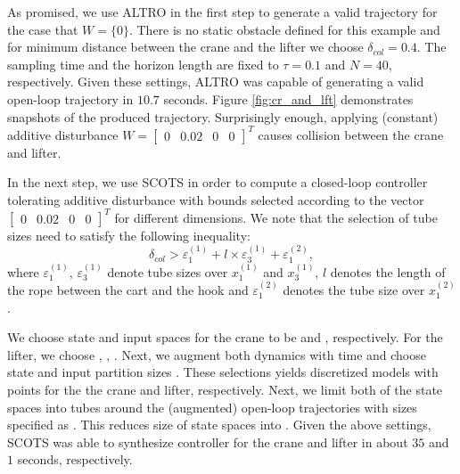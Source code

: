 As promised, we use ALTRO in the first step to generate a valid trajectory for the case that $W=\{0\}$. There is no static obstacle defined for this example and for minimum distance between the crane and the lifter we choose $\delta_{col}=0.4$. The sampling time and the horizon length are fixed to $\tau=0.1$ and $N=40$, respectively. Given these settings, ALTRO was capable of generating a valid open-loop trajectory in $10.7$ seconds. Figure \ref{fig:cr_and_lft} demonstrates snapshots of the produced trajectory. Surprisingly enough, applying (constant) additive disturbance $W=\begin{bmatrix}0&0.02&0&0\end{bmatrix}^T$ causes collision between the crane and lifter.

In the next step, we use SCOTS in order to compute a closed-loop controller tolerating additive disturbance with bounds selected according to the vector $\begin{bmatrix}0&0.02&0&0\end{bmatrix}^T$ for different dimensions. We note that the selection of tube sizes need to satisfy the following inequality:
\[ \delta_{col}> \varepsilon_{1}^{(1)} + l\times\varepsilon_{3}^{(1)} + \varepsilon_{1}^{(2)},\]
where $\varepsilon_{1}^{(1)}$, $\varepsilon_{3}^{(1)}$ denote tube sizes over $x_1^{(1)}$ and $x_3^{(1)}$, $l$ denotes the length of the rope between the cart and the hook and $\varepsilon_{1}^{(2)}$ denotes the tube size over $x_1^{(2)}$. 


We choose state and input spaces for the crane to be  and , respectively. For the lifter, we choose , , . Next, we augment both dynamics with time and choose state and input partition sizes . These selections yields discretized models with  points for the the crane and lifter, respectively. Next, we limit both of the state spaces into tubes around the (augmented) open-loop trajectories with sizes specified as . This reduces size of state spaces into . Given the above settings, SCOTS was able to synthesize controller for the crane and lifter in about $35$ and $1$ seconds, respectively.
			
